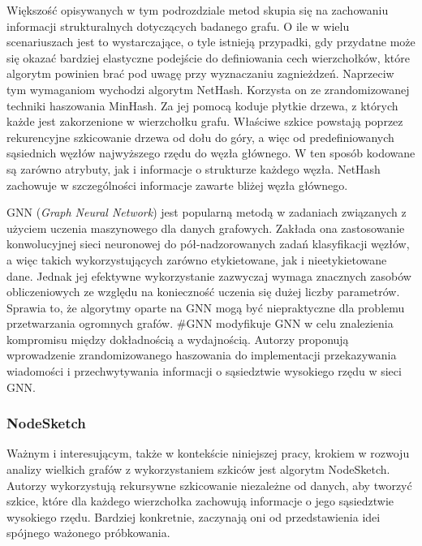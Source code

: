         Większość opisywanych w tym podrozdziale metod skupia się na zachowaniu informacji strukturalnych dotyczących badanego grafu. O ile w wielu scenariuszach jest to wystarczające, o tyle istnieją przypadki, gdy przydatne może się okazać bardziej elastyczne podejście do definiowania cech wierzchołków, które algorytm powinien brać pod uwagę przy wyznaczaniu zagnieżdzeń. Naprzeciw tym wymaganiom wychodzi algorytm NetHash\cite{Wu_Li_Chen_Zhang_2018}. Korzysta on ze zrandomizowanej techniki haszowania MinHash. Za jej pomocą koduje płytkie drzewa, z których każde jest zakorzenione w wierzchołku grafu. Właściwe szkice powstają poprzez rekurencyjne szkicowanie drzewa od dołu do góry, a więc od predefiniowanych sąsiednich węzłów najwyższego rzędu do węzła głównego. W ten sposób kodowane są zarówno atrybuty, jak i informacje o strukturze każdego węzła. NetHash zachowuje w szczególności  informacje zawarte bliżej węzła głównego.
        
        GNN\cite{4700287} (\emph{Graph Neural Network}) jest popularną metodą w zadaniach związanych z użyciem uczenia maszynowego dla danych grafowych. Zakłada ona zastosowanie konwolucyjnej sieci neuronowej do pół-nadzorowanych zadań klasyfikacji węzłów, a więc takich wykorzystujących zarówno etykietowane, jak i nieetykietowane dane. Jednak jej efektywne wykorzystanie zazwyczaj wymaga znacznych zasobów obliczeniowych ze względu na konieczność uczenia się dużej liczby parametrów. Sprawia to, że algorytmy oparte na GNN mogą być niepraktyczne dla problemu przetwarzania ogromnych grafów. \#GNN\cite{Wu_Li_Luo_Nejdl_2021} modyfikuje GNN w celu znalezienia kompromisu między dokładnością a wydajnością. Autorzy proponują wprowadzenie zrandomizowanego haszowania do implementacji przekazywania wiadomości i przechwytywania  informacji o sąsiedztwie wysokiego rzędu w sieci GNN. 
        
        \subsubsection*{NodeSketch}
            Ważnym i interesującym, także w kontekście niniejszej pracy, krokiem w rozwoju analizy wielkich grafów z wykorzystaniem szkiców jest algorytm NodeSketch\cite{Yang_Rosso_Li_Cudre-Mauroux_2019}. Autorzy wykorzystują rekursywne szkicowanie niezależne od danych, aby tworzyć szkice, które dla każdego wierzchołka zachowują informacje o jego sąsiedztwie wysokiego rzędu. Bardziej konkretnie, zaczynają oni od przedstawienia idei spójnego ważonego próbkowania. 
        
